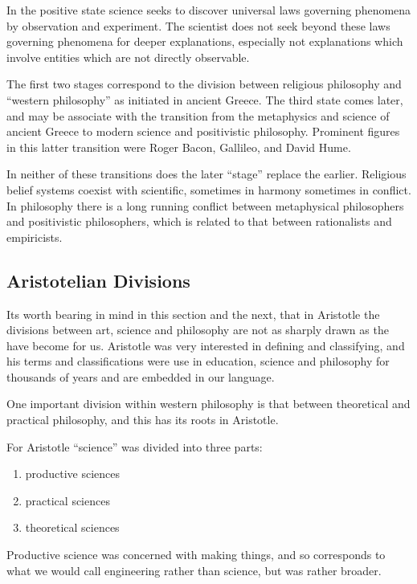 \documentclass[10pt,titlepage]{article}
\begin{document}
    In the positive state science seeks to discover universal laws governing phenomena by observation and experiment. The scientist does not seek beyond these laws governing phenomena for deeper explanations, especially not explanations which involve entities which are not directly observable.

The first two stages correspond to the division between religious philosophy and ``western philosophy'' as initiated in ancient Greece.
The third state comes later, and may be associate with the transition from the metaphysics and science of ancient Greece to modern science and positivistic philosophy.
Prominent figures in this latter transition were Roger Bacon, Gallileo, and David Hume.

In neither of these transitions does the later ``stage'' replace the earlier.
Religious belief systems coexist with scientific, sometimes in harmony sometimes in conflict.
In philosophy there is a long running conflict between metaphysical philosophers and positivistic philosophers, which is related to that between rationalists and empiricists.

\subsection{Aristotelian Divisions}

Its worth bearing in mind in this section and the next, that in Aristotle the divisions between art, science and philosophy are not as sharply drawn as the have become for us.
Aristotle was very interested in defining and classifying, and his terms and classifications were use in education, science and philosophy for thousands of years and are embedded in our language.

One important division within western philosophy is that between theoretical and practical philosophy, and this has its roots in Aristotle.

For Aristotle ``science'' was divided into three parts:

\begin{enumerate}
\item productive sciences
\item practical sciences
\item theoretical sciences
\end{enumerate}

Productive science was concerned with making things, and so corresponds to what we would call engineering rather than science, but was rather broader.
\end{document}
